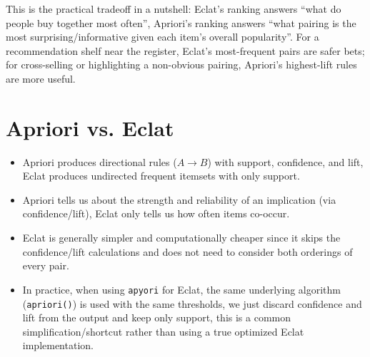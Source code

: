 \documentclass[conference]{IEEEtran}
\begin{document}
This is the practical tradeoff in a nutshell: Eclat's ranking answers ``what do people buy together most often'', Apriori's ranking answers ``what pairing is the most surprising/informative given each item's overall popularity''. For a recommendation shelf near the register, Eclat's most-frequent pairs are safer bets; for cross-selling or highlighting a non-obvious pairing, Apriori's highest-lift rules are more useful.

\section*{Apriori vs. Eclat}
\begin{itemize}
    \item Apriori produces directional rules ($A \rightarrow B$) with support, confidence, and lift, Eclat produces undirected frequent itemsets with only support.
    \item Apriori tells us about the strength and reliability of an implication (via confidence/lift), Eclat only tells us how often items co-occur.
    \item Eclat is generally simpler and computationally cheaper since it skips the confidence/lift calculations and does not need to consider both orderings of every pair.
    \item In practice, when using \texttt{apyori} for Eclat, the same underlying algorithm (\texttt{apriori()}) is used with the same thresholds, we just discard confidence and lift from the output and keep only support, this is a common simplification/shortcut rather than using a true optimized Eclat implementation.
\end{itemize}
\end{document}
